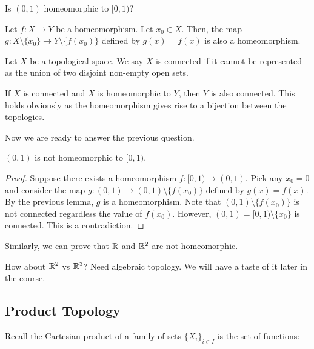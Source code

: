\begin{example}
  Is $(0,1)$ homeomorphic to $[0,1)$?
\end{example}

\begin{lemma}
  Let $f:X \to Y$ be a homeomorphism. Let $x_0\in X$. Then, the map $g:X\setminus \{x_0\} \to Y \setminus \{f(x_0)\}$ defined by $g(x) = f(x)$ is also a homeomorphism.
\end{lemma}

\begin{definition}
  Let $X$ be a topological space. We say $X$ is connected if it cannot be represented as the union of two disjoint non-empty open sets. 
\end{definition}

\begin{remark}
  If $X$ is connected and $X$ is homeomorphic to $Y$, then $Y$ is also connected. This holds obviously as the homeomorphism gives rise to a bijection between the topologies.
\end{remark}

Now we are ready to answer the previous question.

\begin{theorem}
  $(0,1)$ is not homeomorphic to $[0,1)$.
\end{theorem}
\begin{proof}
  Suppose there exists a homeomorphism $f:[0,1)\to(0,1)$. Pick any $x_0=0$ and consider the map $g:(0,1)\to(0,1)\setminus\{f(x_0)\}$ defined by $g(x)=f(x)$. By the previous lemma, $g$ is a homeomorphism. 
  Note that $(0,1)\setminus\{f(x_0)\}$ is not connected regardless the value of $f(x_0)$. However, $(0,1)=[0,1)\setminus\{x_0\}$ is connected. This is a contradiction.
\end{proof}

\begin{example}
  Similarly, we can prove that $\mathbb{R}$ and $\mathbb{R}^2$ are not homeomorphic. 
  
  How about $\mathbb{R}^2$ vs $\mathbb{R}^3$? Need algebraic topology. We will have a taste of it later in the course.
\end{example}


\subsection{Product Topology}

Recall the Cartesian product of a family of sets $\{X_i\}_{i\in I}$ is the set of functions:

